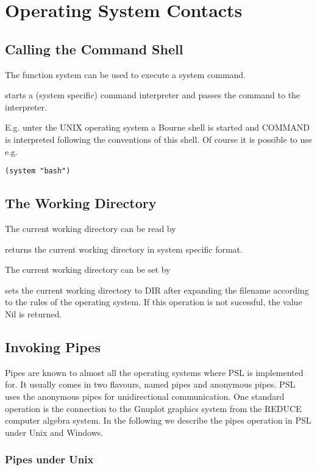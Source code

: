 \chapter{Operating System Contacts}

\section{Calling the Command Shell}

The function system can be used to execute a system command.

{ starts a (system specific) command interpreter and passes the
command to the interpreter.}

E.g. unter the UNIX operating system a Bourne shell is started and
COMMAND is interpreted following the conventions of this shell.
Of course it is possible to use e.g.
\begin{verbatim}
(system "bash")
\end{verbatim}


\section{The Working Directory}

The current working directory can be read by

{returns the current working directory in system specific format.}

The current working directory can be set by

{sets the current working directory to DIR after expanding the
filename according to the rules of the operating system. If this operation
is not sucessful, the value Nil is returned.}

\section{Invoking Pipes}

Pipes are known to almost all the operating systems where PSL is implemented
for. It usually comes in two flavours, named pipes and anonymous pipes.
PSL uses the anonymous pipes for unidirectional communication.
One standard operation is the connection to the Gnuplot graphics system
from the REDUCE computer algebra system.
In the following we describe the pipes operation in PSL under Unix and
Windows.

\subsection{Pipes under Unix}

